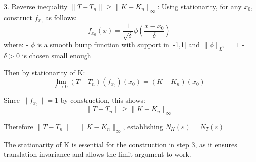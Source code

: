 \documentclass{article}
\begin{document}
3. Reverse inequality $\|T - T_n\| \geq \|K - K_n\|_{\infty}$:
   Using stationarity, for any $x_0$, construct $f_{x_0}$ as follows:
   \[f_{x_0}(x) = \frac{1}{\sqrt{\delta}}\phi(\frac{x-x_0}{\delta})\]
   where:
   - $\phi$ is a smooth bump function with support in [-1,1] and $\|\phi\|_{L^2} = 1$
   - $\delta > 0$ is chosen small enough

   Then by stationarity of K:
   \[\lim_{\delta \to 0} (T - T_n)(f_{x_0})(x_0) = (K - K_n)(x_0)\]
   
   Since $\|f_{x_0}\| = 1$ by construction, this shows:
   \[\|T - T_n\| \geq \|K - K_n\|_{\infty}\]

Therefore $\|T - T_n\| = \|K - K_n\|_{\infty}$, establishing $N_K(\varepsilon) = N_T(\varepsilon)$

The stationarity of K is essential for the construction in step 3, as it ensures translation invariance and allows the limit argument to work.
\end{document}
